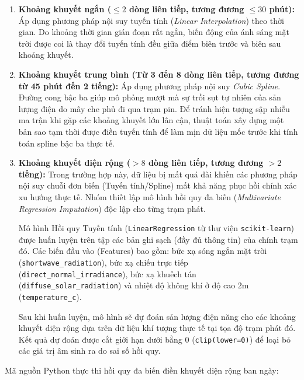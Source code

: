 \documentclass[12pt, a4paper]{report}
\begin{document}
\begin{enumerate}[label=\alph*., leftmargin=*]
    \item \textbf{Khoảng khuyết ngắn ($\le 2$ dòng liên tiếp, tương đương $\le 30$ phút):} Áp dụng phương pháp nội suy tuyến tính (\textit{Linear Interpolation}) theo thời gian. Do khoảng thời gian gián đoạn rất ngắn, biến động của ánh sáng mặt trời được coi là thay đổi tuyến tính đều giữa điểm biên trước và biên sau khoảng khuyết.
    \item \textbf{Khoảng khuyết trung bình (Từ 3 đến 8 dòng liên tiếp, tương đương từ 45 phút đến 2 tiếng):} Áp dụng phương pháp nội suy \textit{Cubic Spline}. Đường cong bậc ba giúp mô phỏng mượt mà sự trồi sụt tự nhiên của sản lượng điện do mây che phủ đi qua trạm pin. Để tránh hiện tượng sập nhiễu ma trận khi gặp các khoảng khuyết lớn lân cận, thuật toán xây dựng một bản sao tạm thời được điền tuyến tính để làm mịn dữ liệu mốc trước khi tính toán spline bậc ba thực tế.
    \item \textbf{Khoảng khuyết diện rộng ($> 8$ dòng liên tiếp, tương đương $> 2$ tiếng):} Trong trường hợp này, dữ liệu bị mất quá dài khiến các phương pháp nội suy chuỗi đơn biến (Tuyến tính/Spline) mất khả năng phục hồi chính xác xu hướng thực tế. Nhóm thiết lập mô hình hồi quy đa biến (\textit{Multivariate Regression Imputation}) độc lập cho từng trạm phát.
    
    Mô hình Hồi quy Tuyến tính (\texttt{LinearRegression} từ thư viện \texttt{scikit-learn}) được huấn luyện trên tập các bản ghi sạch (đầy đủ thông tin) của chính trạm đó. Các biến đầu vào (Features) bao gồm: bức xạ sóng ngắn mặt trời (\texttt{shortwave\_radiation}), bức xạ chiếu trực tiếp (\texttt{direct\_normal\_irradiance}), bức xạ khuếch tán (\texttt{diffuse\_solar\_radiation}) và nhiệt độ không khí ở độ cao 2m (\texttt{temperature\_c}). 
    
    Sau khi huấn luyện, mô hình sẽ dự đoán sản lượng điện năng cho các khoảng khuyết diện rộng dựa trên dữ liệu khí tượng thực tế tại tọa độ trạm phát đó. Kết quả dự đoán được cắt giới hạn dưới bằng 0 (\texttt{clip(lower=0)}) để loại bỏ các giá trị âm sinh ra do sai số hồi quy.
\end{enumerate}

Mã nguồn Python thực thi hồi quy đa biến điền khuyết diện rộng ban ngày:
\end{document}
